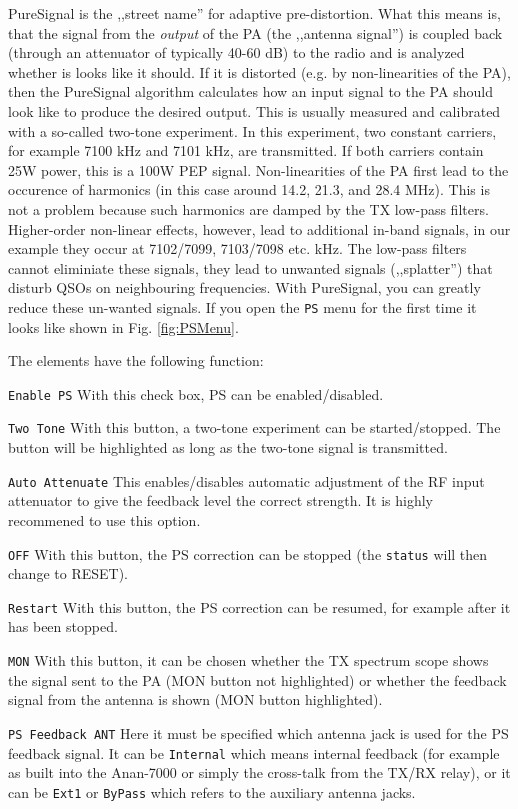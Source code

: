 \documentclass[12pt]{book}
\def\rett#1{\texttt{\color{red}#1}}
\def\bltt#1{\texttt{\color{blue}#1}}
\begin{document}
PureSignal is the ,,street name'' for adaptive pre-distortion. What this means is, that
the signal from the \textit{output} of the PA (the ,,antenna signal'') is coupled
back (through an attenuator of typically 40-60 dB) to the radio and is analyzed 
whether is looks like it should. If it is distorted (e.g. by non-linearities of the PA),
then the PureSignal algorithm calculates how an input signal to the PA should look like
to produce the desired output. This is usually measured and calibrated with a so-called
two-tone experiment. In this experiment, two constant carriers, for example 7100 kHz
and 7101 kHz, are transmitted. If both carriers contain 25W power, this is
a 100W PEP signal. Non-linearities of the PA first lead to the occurence of harmonics
(in this case around 14.2, 21.3, and 28.4 MHz). This is not a problem because
such harmonics are  damped by the TX low-pass filters. Higher-order non-linear effects,
however, lead to additional in-band signals, in our example they occur at
7102/7099, 7103/7098 etc. kHz. The low-pass filters cannot eliminiate these signals,
they lead to unwanted signals (,,splatter'') that disturb QSOs on neighbouring
frequencies. With PureSignal, you can greatly reduce these un-wanted signals.
If you open the \bltt{PS} menu for the first time it looks like shown in Fig.
\ref{fig:PSMenu}.



The elements have the following function:

\rett{Enable PS} With this check box, PS can be enabled/disabled.

\rett{Two Tone} With this button, a two-tone experiment can be started/stopped. The button
will be highlighted as long as the two-tone signal is transmitted.

\rett{Auto Attenuate} This enables/disables automatic adjustment of the RF input
attenuator to give the feedback level the correct strength. It is highly recommened
to use this option.

\rett{OFF} With this button, the PS correction can be stopped (the \rett{status} will
then change to RESET).

\rett{Restart} With this button, the PS correction can be resumed, for example after
it has been stopped.

\rett{MON} With this button, it can be chosen whether the TX spectrum scope shows
the signal sent to the PA (MON button not highlighted) or whether the feedback signal
from the antenna is shown (MON button highlighted).

\rett{PS Feedback ANT} Here it must be specified which antenna jack is used for the
PS feedback signal. It can be \rett{Internal} which means internal feedback
(for example as built into the Anan-7000 or  simply the cross-talk from the
TX/RX relay), or it can be \rett{Ext1} or \rett{ByPass} which refers to the
auxiliary antenna jacks. 
\end{document}

